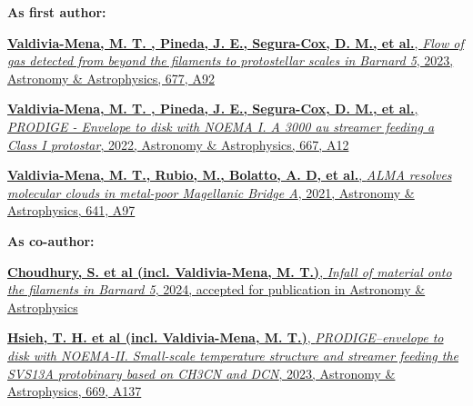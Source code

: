 \vspace{8pt}

\begin{cvparagraph}
\textbf{As first author:}
\vspace{4pt}
\begin{cvitems} %
	\item{\href{https://ui.adsabs.harvard.edu/abs/2023A%26A...677A..92V/abstract}{ \textbf{Valdivia-Mena, M. T. , Pineda, J. E., Segura-Cox, D. M., et al.}, \textit{Flow of gas detected from beyond the filaments to protostellar scales in Barnard 5}, 2023, Astronomy \& Astrophysics, 677, A92}}
	\item{\href{https://ui.adsabs.harvard.edu/abs/2022A%26A...667A..12V/abstract}{\textbf{Valdivia-Mena, M. T. , Pineda, J. E., Segura-Cox, D. M., et al.}, \textit{PRODIGE - Envelope to disk with NOEMA I. A 3000 au streamer feeding a Class I protostar}, 2022, Astronomy \& Astrophysics, 667, A12} }
	\item{\href{https://ui.adsabs.harvard.edu/abs/2020A%26A...641A..97V/abstract}{ \textbf{Valdivia-Mena, M. T., Rubio, M., Bolatto, A. D, et al.}, \textit{ALMA resolves molecular clouds in metal-poor Magellanic Bridge A}, 2021, Astronomy \& Astrophysics, 641, A97}}
\end{cvitems}
\vspace{8pt}
\textbf{As co-author:}
\vspace{4pt}
\begin{cvitems} %
	\item{\href{https://ui.adsabs.harvard.edu/abs/2023arXiv231217398C/abstract}{\textbf{Choudhury, S. et al (incl. Valdivia-Mena, M. T.)}, \textit{Infall of material onto the filaments in Barnard 5}, 2024, accepted for publication in Astronomy \& Astrophysics}}
	\item{\href{https://ui.adsabs.harvard.edu/abs/2023A%26A...669A.137H/abstract}{\textbf{Hsieh, T. H. et al (incl. Valdivia-Mena, M. T.)}, \textit{PRODIGE–envelope to disk with NOEMA-II. Small-scale temperature structure and streamer feeding the SVS13A protobinary based on CH3CN and DCN}, 2023, Astronomy \& Astrophysics, 669, A137}}
	
\end{cvitems}
\vspace{4pt}
\end{cvparagraph}


